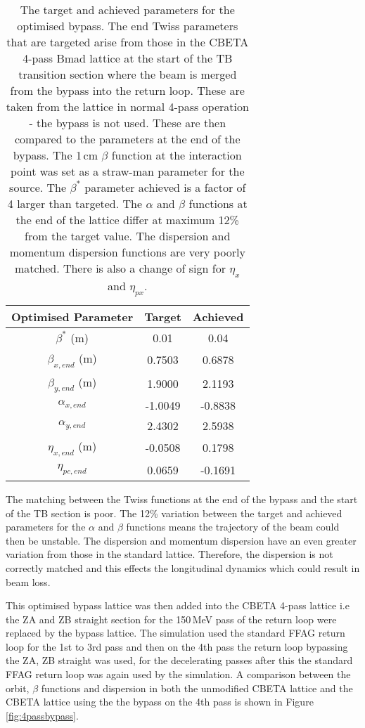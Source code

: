 \documentclass[11pt]{article}
\begin{document}
\begin{table}[H]
\centering
\begin{tabular}{|c||c|c|}
\hline
\textbf{Optimised Parameter} & \textbf{Target} & \textbf{Achieved} \\
\hline
$\beta^{*}$ (m) & 0.01 & 0.04 \\
\hline
$\beta_{x, end}$ (m) & 0.7503 & 0.6878 \\
\hline
$\beta_{y, end}$ (m) & 1.9000 & 2.1193 \\
\hline
$\alpha_{x, end}$ & -1.0049 & -0.8838 \\
\hline
$\alpha_{y, end}$ & 2.4302 & 2.5938 \\
\hline
$\eta_{x, end}$ (m) & -0.0508 & 0.1798 \\
\hline
$\eta_{pc, end}$ & 0.0659 & -0.1691 \\
\hline
\end{tabular}
\caption{\label{tab:bypassopt} The target and achieved parameters for the optimised bypass. The end Twiss parameters that are targeted arise from those in the CBETA 4-pass Bmad lattice at the start of the TB transition section where the beam is merged from the bypass into the return loop. These are taken from the lattice in normal 4-pass operation - the bypass is not used. These are then compared to the parameters at the end of the bypass. The 1\,cm $\beta$ function at the interaction point was set as a straw-man parameter for the source. The $\beta^{*}$ parameter achieved is a factor of 4 larger than targeted.  The $\alpha$ and $\beta$ functions at the end of the lattice differ at maximum 12\% from the target value. The dispersion and momentum dispersion functions are very poorly matched. There is also a change of sign for $\eta_{x}$ and $\eta_{px}$.}
\end{table}     

The matching between the Twiss functions at the end of the bypass and the start of the TB section is poor. The 12\% variation between the target and achieved parameters for the $\alpha$ and $\beta$ functions means the trajectory of the beam could then be unstable. The dispersion and momentum dispersion have an even greater variation from those in the standard lattice. Therefore, the dispersion is not correctly matched and this effects the longitudinal dynamics which could result in beam loss.

This optimised bypass lattice was then added into the CBETA 4-pass lattice i.e the ZA and ZB straight section for the 150\,MeV pass of the return loop were replaced by the bypass lattice. The simulation used the standard FFAG return loop for the 1st to 3rd pass and then on the 4th pass the return loop bypassing the ZA, ZB straight was used, for the decelerating passes after this the standard FFAG return loop was again used by the simulation. A comparison between the orbit, $\beta$ functions and dispersion in both the unmodified CBETA lattice and the CBETA lattice using the the bypass on the 4th pass is shown in Figure \ref{fig:4passbypass}.
\end{document}
